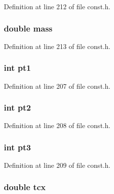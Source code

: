 Definition at line 212 of file const.\+h.

\hypertarget{structdtriangle_a244bf42c46054cf1113be44d55f2156d}{}
\subsubsection[{mass}]{\setlength{\rightskip}{0pt plus 5cm}double mass}\label{structdtriangle_a244bf42c46054cf1113be44d55f2156d}


Definition at line 213 of file const.\+h.

\hypertarget{structdtriangle_ad4dd21cfb36fef8c13b031ef8d129cda}{}
\subsubsection[{pt1}]{\setlength{\rightskip}{0pt plus 5cm}int pt1}\label{structdtriangle_ad4dd21cfb36fef8c13b031ef8d129cda}


Definition at line 207 of file const.\+h.

\hypertarget{structdtriangle_a2f2da6c89bdba6cc078fa38551e01883}{}
\subsubsection[{pt2}]{\setlength{\rightskip}{0pt plus 5cm}int pt2}\label{structdtriangle_a2f2da6c89bdba6cc078fa38551e01883}


Definition at line 208 of file const.\+h.

\hypertarget{structdtriangle_ae702403b2e0fc6a7c2b67e13ccbd8fc2}{}
\subsubsection[{pt3}]{\setlength{\rightskip}{0pt plus 5cm}int pt3}\label{structdtriangle_ae702403b2e0fc6a7c2b67e13ccbd8fc2}


Definition at line 209 of file const.\+h.

\hypertarget{structdtriangle_a35321f9e48b2f5cfb8aecd31b5cc159f}{}
\subsubsection[{tcx}]{\setlength{\rightskip}{0pt plus 5cm}double tcx}\label{structdtriangle_a35321f9e48b2f5cfb8aecd31b5cc159f}


